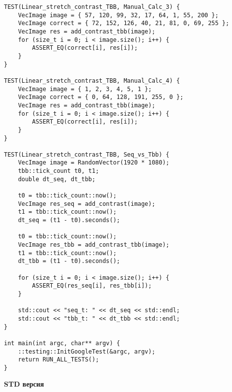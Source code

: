 \documentclass{report}
\begin{document}
\begin{lstlisting}
TEST(Linear_stretch_contrast_TBB, Manual_Calc_3) {
    VecImage image = { 57, 120, 99, 32, 17, 64, 1, 55, 200 };
    VecImage correct = { 72, 152, 126, 40, 21, 81, 0, 69, 255 };
    VecImage res = add_contrast_tbb(image);
    for (size_t i = 0; i < image.size(); i++) {
        ASSERT_EQ(correct[i], res[i]);
    }
}

TEST(Linear_stretch_contrast_TBB, Manual_Calc_4) {
    VecImage image = { 1, 2, 3, 4, 5, 1 };
    VecImage correct = { 0, 64, 128, 191, 255, 0 };
    VecImage res = add_contrast_tbb(image);
    for (size_t i = 0; i < image.size(); i++) {
        ASSERT_EQ(correct[i], res[i]);
    }
}

TEST(Linear_stretch_contrast_TBB, Seq_vs_Tbb) {
    VecImage image = RandomVector(1920 * 1080);
    tbb::tick_count t0, t1;
    double dt_seq, dt_tbb;

    t0 = tbb::tick_count::now();
    VecImage res_seq = add_contrast(image);
    t1 = tbb::tick_count::now();
    dt_seq = (t1 - t0).seconds();

    t0 = tbb::tick_count::now();
    VecImage res_tbb = add_contrast_tbb(image);
    t1 = tbb::tick_count::now();
    dt_tbb = (t1 - t0).seconds();

    for (size_t i = 0; i < image.size(); i++) {
        ASSERT_EQ(res_seq[i], res_tbb[i]);
    }

    std::cout << "seq_t: " << dt_seq << std::endl;
    std::cout << "tbb_t: " << dt_tbb << std::endl;
}

int main(int argc, char** argv) {
    ::testing::InitGoogleTest(&argc, argv);
    return RUN_ALL_TESTS();
}
    \end{lstlisting}
    \textbf{STD версия}
\end{document}
